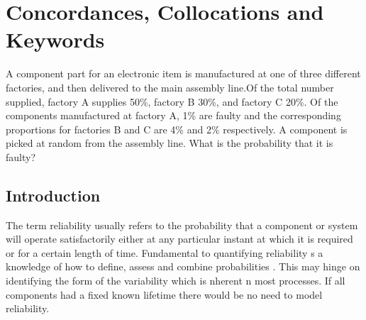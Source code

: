 \chapter{Concordances, Collocations and Keywords}

A component part for an electronic item is
manufactured at one of three different factories, and then delivered to
the main assembly line.Of the total number supplied, factory A supplies
50\%, factory B 30\%, and factory C 20\%. Of the components
manufactured at factory A, 1\% are faulty and the corresponding
proportions for factories B and C are 4\% and 2\% respectively. A
component is picked at random from the assembly line. What is the
probability that it is faulty?

\section{Introduction}\label{intro}
The term reliability usually refers to the probability that a
component or system will operate satisfactorily either at any particular
instant at which it is required or for a certain length of
time. Fundamental to quantifying reliability s a knowledge of how to
define, assess and combine probabilities \cite{Bontempi2005Adaptive}. This may hinge on identifying the
form of the variability which is nherent n most processes. If all
components had a fixed known lifetime there would be no need to model
reliability.

